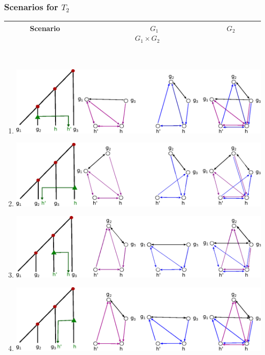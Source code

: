 \documentclass[10pt,a4paper,notitlepage]{article}
\begin{document}
	\subsubsection{Scenarios for $T_2$}		
	\begin{tabular}[h]{|c|}
		\hline	
		Scenario 
		$\;\;\;\;\;\;\;\;\;\;\;\;\;\;\;\;\;\;\;\;\;\;\;\;\;\;\;\;\;\;\;\;\;\;\;\;\;\;\;\;\;\;\;\; {G}_1$
		$\;\;\;\;\;\;\;\;\;\;\;\;\;\;\;\;\;\;\;\;\;\;\;\;\;\;\;\;\;\;\;\;\; {G}_2$ 
		$\;\;\;\;\;\;\;\;\;\;\;\;\;\;\;\;\;\;\;\;\;\;\;\;\;\;\; {G}_1 \times {G}_2  \;\;\;\;\;\;\;\;\;\;\;\;$\\		
		\hline
	\end{tabular}
	\\
\begin{enumerate}
\item 
		\includegraphics[scale=0.7]{fig1}\\
\item
		\includegraphics[scale=0.7]{fig2}\\
\item
		\includegraphics[scale=0.7]{fig3}\\
\item
		\includegraphics[scale=0.7]{fig4}\\

\end{enumerate}
\end{document}
